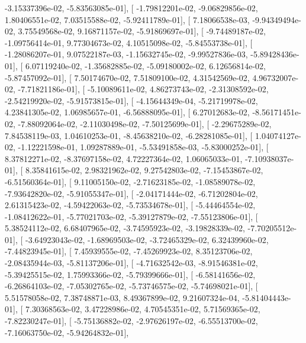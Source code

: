 \documentclass{article}
\begin{document}
         -3.15337396e-02,  -5.83563085e-01],
       [ -1.79812201e-02,  -9.06829856e-02,   1.80406551e-02,
          7.03515588e-02,  -5.92411789e-01],
       [  7.18066538e-03,  -9.94349494e-02,   3.75549568e-02,
          9.16871157e-02,  -5.91869697e-01],
       [ -9.74489187e-02,  -1.09756414e-01,   9.77304673e-02,
          4.10515098e-02,  -5.84553738e-01],
       [ -1.28086207e-01,   9.07522187e-03,  -1.15632745e-02,
         -9.99527836e-03,  -5.89428436e-01],
       [  6.07119240e-02,  -1.35682885e-02,  -5.09180002e-02,
          6.12656814e-02,  -5.87457092e-01],
       [  7.50174670e-02,   7.51809100e-02,   4.31542569e-02,
          4.96732007e-02,  -7.71821186e-01],
       [ -5.10089611e-02,   4.86273743e-02,  -2.31308592e-02,
         -2.54219920e-02,  -5.91573815e-01],
       [ -4.15644349e-04,  -5.21719978e-02,   4.23841305e-02,
          1.06985657e-01,  -6.56888095e-01],
       [  6.27012683e-02,  -8.56171451e-02,  -7.88092064e-02,
         -2.11030498e-02,  -7.50125699e-01],
       [ -2.29675289e-02,   7.84538119e-03,   1.04610253e-01,
         -8.45638210e-02,  -6.28281085e-01],
       [  1.04074127e-02,  -1.12221598e-01,   1.09287889e-01,
         -5.53491858e-03,  -5.83000252e-01],
       [  8.37812271e-02,  -8.37697158e-02,   4.72227364e-02,
          1.06065033e-01,  -7.10938037e-01],
       [  8.35841615e-02,   2.98321962e-02,   9.27542803e-02,
         -7.15453867e-02,  -6.51560364e-01],
       [  9.11005150e-02,  -2.71623185e-02,  -1.08589078e-02,
         -7.93642820e-02,  -5.91055347e-01],
       [ -2.04171444e-02,  -6.71202804e-02,   2.61315423e-02,
         -4.59422063e-02,  -5.73534678e-01],
       [ -5.44464554e-02,  -1.08412622e-01,  -5.77021703e-02,
         -5.39127879e-02,  -7.55123806e-01],
       [  5.38524112e-02,   6.68407965e-02,  -3.74595923e-02,
         -3.19828339e-02,  -7.70205512e-01],
       [ -3.64923043e-02,  -1.68969503e-02,  -3.72465329e-02,
          6.32439960e-02,  -7.44823945e-01],
       [  7.45939555e-02,  -7.45269923e-02,   8.35123706e-02,
         -2.08435944e-03,  -5.81137206e-01],
       [ -4.71632542e-03,  -8.91546381e-02,  -5.39425515e-02,
          1.75993366e-02,  -5.79399666e-01],
       [ -6.58141656e-02,  -6.26864103e-02,  -7.05302765e-02,
         -5.73746575e-02,  -5.74698021e-01],
       [  5.51578058e-02,   7.38748871e-03,   8.49367899e-02,
          9.21607324e-04,  -5.81404443e-01],
       [  7.30368563e-02,   3.47228986e-02,   4.70545351e-02,
          5.71569365e-02,  -7.82230247e-01],
       [ -5.75136882e-02,  -2.97626197e-02,  -6.55513700e-02,
         -7.16063750e-02,  -5.94264832e-01],
\end{document}
